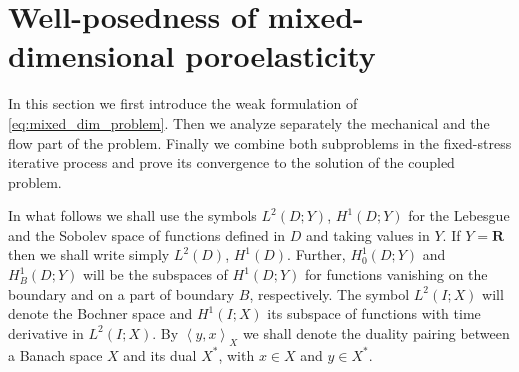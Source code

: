 \documentclass[a4paper]{article}
\numberwithin{equation}{section}
\def\dual#1#2{\left\langle #1,#2\right\rangle}
\def\Real{{\mathbf R}} %
\begin{document}
\section{Well-posedness of mixed-dimensional poroelasticity}\label{sec:well_pos}

In this section we first introduce the weak formulation of \eqref{eq:mixed_dim_problem}.
Then we analyze separately the mechanical and the flow part of the problem.
Finally we combine both subproblems in the fixed-stress iterative process and prove its convergence to the solution of the coupled problem.

In what follows we shall use the symbols $L^2(D;Y)$, $H^1(D;Y)$ for the Lebesgue and the Sobolev space of functions defined in $D$ and taking values in $Y$.
If $Y=\Real$ then we shall write simply $L^2(D)$, $H^1(D)$.
Further, $H^1_0(D;Y)$ and $H^1_B(D;Y)$ will be the subspaces of $H^1(D;Y)$ for functions vanishing on the boundary and on a part of boundary $B$, respectively.
The symbol $L^2( I;X)$ will denote the Bochner space and $H^1( I;X)$ its subspace of functions with time derivative in $L^2( I;X)$.
By $\dual{y}{x}_X$ we shall denote the duality pairing between a Banach space $X$ and its dual $X^*$, with $x\in X$ and $y\in X^*$.
\end{document}
